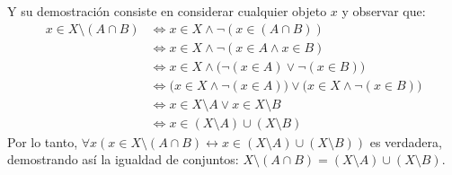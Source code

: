 \documentclass[letterpaper,DIV=14,headsepline,12pt]{scrartcl}
\makeatletter
\newenvironment{solu}[1][]{%
        \par\pushQED{\hfill \lozenge}%
        \normalfont\topsep6pt \partopsep0pt %
        \trivlist
        \item[\hskip\labelsep
                \textbf{\textit{Solución.}}%
        ]#1
        }{%
        \popQED\endtrivlist\@endpefalse
    }
\makeatother
\begin{document}
\begin{solu}
        Y su demostración consiste en considerar cualquier objeto $x$ y observar que:
        \begin{align*}
            x \in X \setminus (A \cap B) & \Leftrightarrow x \in X \land \lnot (x \in (A \cap B)) \tag*{Definición de $\setminus$} \\
            & \Leftrightarrow x \in X \land \lnot (x \in A \land x \in B) \tag*{Definición de $\cap$} \\
            & \Leftrightarrow x \in X \land \big( \lnot (x \in A) \lor \lnot (x \in B) \big) \tag*{$\neg(\alpha\land\beta)\equiv\neg\alpha\lor\neg\beta$} \\
            & \Leftrightarrow \big( x \in X \land \lnot (x \in A) \big) \lor \big( x \in X \land \lnot(x \in B) \big) \tag*{Distribución de $\land$ en $\lor$} \\
            & \Leftrightarrow x \in X \setminus A \lor x \in X \setminus B \tag*{Definición de $\setminus$} \\
            & \Leftrightarrow x \in (X \setminus A) \cup (X \setminus B) \tag*{Definición de $\cup$}
        \end{align*}
        Por lo tanto, $\forall x (x \in X \setminus (A \cap B) \leftrightarrow x \in (X \setminus A) \cup (X \setminus B))$ es verdadera, demostrando así la igualdad de conjuntos: $X \setminus (A \cap B)=(X \setminus A) \cup (X \setminus B)$.
    \end{solu}
\end{document}
